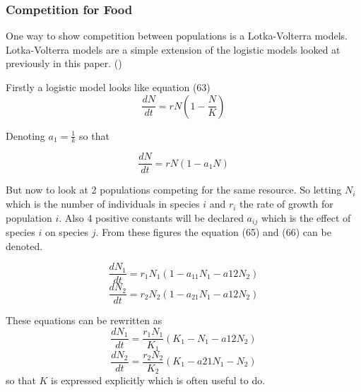 \documentclass[final]{cmpreport}
\begin{document}
		\subsubsection{Competition for Food} 
		
		One way to show competition between populations is a Lotka-Volterra models. Lotka-Volterra models are a simple extension of the logistic models looked at previously in this paper. (\cite{GAUSE44})
		
		Firstly a logistic model looks like equation (63)
		\begin{equation}
		\frac{dN}{dt} = rN(1-\frac{N}{K}) 
		\end{equation}
		
		Denoting $a_1 = \frac{1}{k}$ so that 

		\begin{equation}
		\frac{dN}{dt} = rN(1-a_1N) 
		\end{equation}
		
		But now to look at 2 populations competing for the same resource. So letting $N_i$ which is the number of individuals in species $i$ and $r_i$ the rate of growth for population $i$. Also 4 positive constants will be declared  $a_{ij}$ which is the effect of species $i$ on species $j$. From these figures the equation (65) and (66) can be denoted. 
		
		\begin{equation}
		\frac{dN_1}{dt} = r_1N_1(1-a_{11}N_1-a{12}N_2) 
		\end{equation}
		\begin{equation}
		\frac{dN_2}{dt} = r_2N_2(1-a_{21}N_1-a{12}N_2)  
		\end{equation}
		
		These equations can be rewritten as 
			\begin{equation}
			\frac{dN_1}{dt} = \frac{r_1N_1}{K_1}(K_1-N_1-a{12}N_2) 
			\end{equation}
			\begin{equation}
			\frac{dN_2}{dt} = \frac{r_2N_2}{K_2}(K_1-a{21}N_1-N_2) 
			\end{equation}
		so that $K$ is expressed explicitly which is often useful to do.
\end{document}
